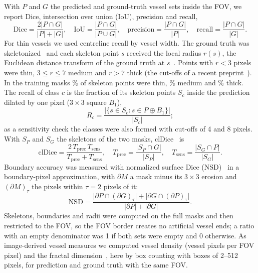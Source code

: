 With $P$ and $G$ the predicted and ground-truth vessel sets inside the FOV, we report Dice, intersection over union (IoU),
precision and recall,
\begin{equation}
\mathrm{Dice} = \frac{2\lvert P \cap G\rvert}{\lvert P\rvert + \lvert G\rvert},\quad
\mathrm{IoU} = \frac{\lvert P \cap G\rvert}{\lvert P \cup G\rvert},\quad
\mathrm{precision} = \frac{\lvert P \cap G\rvert}{\lvert P\rvert},\quad
\mathrm{recall} = \frac{\lvert P \cap G\rvert}{\lvert G\rvert}.
\end{equation}
For thin vessels we used centreline recall by vessel width. The ground truth was skeletonized~\cite{vanderwalt2014skimage,zhang1984thinning}
and each skeleton point $s$ received the local radius $r(s)$, the Euclidean distance transform of the ground truth at
$s$~\cite{virtanen2020scipy}. Points with $r < 3$ pixels were thin, $3 \le r \le 7$ medium and $r > 7$ thick (the cut-offs
of a recent preprint~\cite{amarnath2026resolution}). In the training masks \ShareThin\% of skeleton points were thin, \ShareMed\% medium and \ShareThick\% thick. The recall
of class $c$ is the fraction of its skeleton points $S_c$ inside the prediction dilated by one pixel ($3 \times 3$ square
$B_1$),
\begin{equation}
R_c = \frac{\lvert \{ s \in S_c : s \in P \oplus B_1 \} \rvert}{\lvert S_c \rvert};
\end{equation}
as a sensitivity check the classes were also formed with cut-offs of 4 and 8 pixels. With $S_P$ and $S_G$ the skeletons of
the two masks, clDice~\cite{shit2021cldice} is
\begin{equation}
\mathrm{clDice} = \frac{2\,T_{\mathrm{prec}}\,T_{\mathrm{sens}}}{T_{\mathrm{prec}} + T_{\mathrm{sens}}},\quad
T_{\mathrm{prec}} = \frac{\lvert S_P \cap G\rvert}{\lvert S_P\rvert},\quad
T_{\mathrm{sens}} = \frac{\lvert S_G \cap P\rvert}{\lvert S_G\rvert}.
\end{equation}
Boundary accuracy was measured with normalized surface Dice (NSD)~\cite{nikolov2021nsd} in a boundary-pixel approximation,
with $\partial M$ a mask minus its $3 \times 3$ erosion and $(\partial M)_\tau$ the pixels within $\tau = 2$ pixels of it:
\begin{equation}
\mathrm{NSD} = \frac{\lvert \partial P \cap (\partial G)_\tau\rvert + \lvert \partial G \cap (\partial P)_\tau\rvert}
{\lvert \partial P\rvert + \lvert \partial G\rvert}.
\end{equation}
Skeletons, boundaries and radii were computed on the full masks and then restricted to the FOV, so the FOV border creates
no artificial vessel ends; a ratio with an empty denominator was 1 if both sets were empty and 0 otherwise. As
image-derived vessel measures we computed vessel density (vessel pixels per FOV pixel) and the fractal
dimension~\cite{liew2008fractal}, here by box counting with boxes of 2--512 pixels, for prediction and ground truth with
the same FOV.


